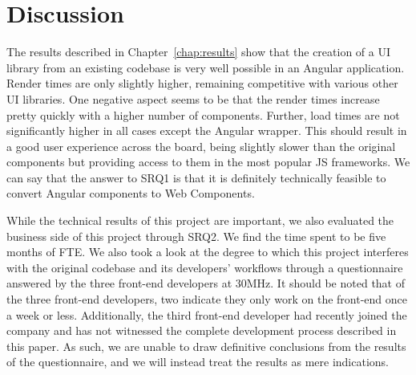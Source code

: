 \chapter{Discussion}\label{chap:discussion}

The results described in Chapter~\ref{chap:results} show that the creation of a UI library from an existing codebase is very well possible in an Angular application. Render times are only slightly higher, remaining competitive with various other UI libraries. One negative aspect seems to be that the render times increase pretty quickly with a higher number of components. Further, load times are not significantly higher in all cases except the Angular wrapper. This should result in a good user experience across the board, being slightly slower than the original components but providing access to them in the most popular JS frameworks. We can say that the answer to SRQ1 is that it is definitely technically feasible to convert Angular components to Web Components.

While the technical results of this project are important, we also evaluated the business side of this project through SRQ2. We find the time spent to be five months of FTE\@. We also took a look at the degree to which this project interferes with the original codebase and its developers' workflows through a questionnaire answered by the three front-end developers at 30MHz. It should be noted that of the three front-end developers, two indicate they only work on the front-end once a week or less. Additionally, the third front-end developer had recently joined the company and has not witnessed the complete development process described in this paper. As such, we are unable to draw definitive conclusions from the results of the questionnaire, and we will instead treat the results as mere indications.

